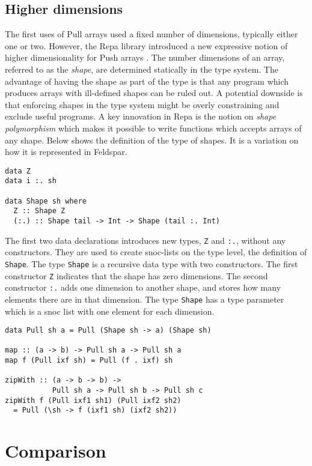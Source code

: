 \documentclass{sigplanconf}
\begin{document}
\subsection{Higher dimensions}

The first uses of Pull arrays used a fixed number of dimensions,
typically either one or two. However, the Repa library introduced a
new expressive notion of higher dimensionality for Push arrays
\cite{keller2010regular}. The number dimensions of an array, referred
to as the \emph{shape}, are determined statically in the type
system. The advantage of having the shape as part of the type is that
any program which produces arrays with ill-defined shapes can be ruled
out. A potential downside is that enforcing shapes in the type system might
be overly constraining and exclude useful programs. A key innovation in
Repa is the notion on \emph{shape polymorphism} which makes it
possible to write functions which accepts arrays of any shape. Below
shows the definition of the type of shapes. It is a variation on how
it is represented in Feldspar.

\begin{verbatim}
data Z
data i :. sh

data Shape sh where
  Z :: Shape Z
  (:.) :: Shape tail -> Int -> Shape (tail :. Int)
\end{verbatim}

The first two data declarations introduces new types, \verb!Z! and
\verb!:.!, without any constructors. They are used to create
snoc-lists on the type level, the definition of \verb!Shape!.  The
type \verb!Shape! is a recursive data type with two constructors. The
first constructor \verb!Z! indicates that the shape has zero
dimensions.  The second constructor \verb!:.! adds one dimension to
another shape, and stores how many elements there are in that
dimension. The type \verb!Shape! has a type parameter which is a snoc
list with one element for each dimension.

\begin{verbatim}
data Pull sh a = Pull (Shape sh -> a) (Shape sh)

map :: (a -> b) -> Pull sh a -> Pull sh a
map f (Pull ixf sh) = Pull (f . ixf) sh

zipWith :: (a -> b -> b) -> 
           Pull sh a -> Pull sh b -> Pull sh c
zipWith f (Pull ixf1 sh1) (Pull ixf2 sh2)
  = Pull (\sh -> f (ixf1 sh) (ixf2 sh2))
\end{verbatim}


\section{Comparison}
\end{document}
